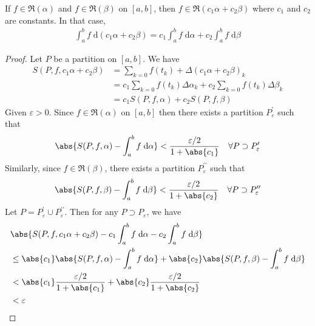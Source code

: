 \documentclass[thmcnt=section, 12pt]{elegantbook}
\begin{document}
\begin{theorem} \label{thm:35}
    If $f \in \mathfrak{R}(\alpha)$ and $f \in \mathfrak{R}(\beta)$ on $[a,b]$, then $f \in \mathfrak{R}(c_1 \alpha + c_2 \beta)$ where $c_1$ and $c_2$ are constants. In that case, 
    \begin{align*}
        \int_a^b f \; \mathrm{d}(c_1 \alpha + c_2 \beta)
        = c_1 \int_a^b f \; \mathrm{d}\alpha
        + c_2 \int_a^b f \; \mathrm{d}\beta
    \end{align*}
\end{theorem}

\begin{proof}
    Let $P$ be a partition on $[a,b]$. We have 
    \begin{align*}
        S(P, f, c_1 \alpha + c_2 \beta)
        &= \sum_{k=0} f(t_k) + \Delta(c_1 \alpha + c_2 \beta)_k \\ 
        &= c_1 \sum_{k=0} f(t_k) \Delta\alpha_k
        + c_2 \sum_{k=0} f(t_k) \Delta\beta_k \\ 
        &= c_1 S(P, f, \alpha) + c_2 S(P, f, \beta)
    \end{align*}
    Given $\varepsilon > 0$. Since $f \in \mathfrak{R}(\alpha)$ on $[a,b]$ then there exists a partition $P_\varepsilon^{\prime}$
    such that 
    \begin{align*}
        \abs{S(P, f, \alpha) - \int_a^b f \; \mathrm{d}\alpha} < \frac{\varepsilon / 2}{1 + \abs{c_1}}
        \quad \forall P \supset P_\varepsilon^{\prime}
    \end{align*}
    Similarly, since $f \in \mathfrak{R}(\beta)$, there exists a partition $P_\varepsilon^{\prime\prime}$ such that 
    \begin{align*}
        \abs{S(P, f, \beta) - \int_a^b f \; \mathrm{d}\beta} < \frac{\varepsilon / 2}{1 + \abs{c_2}}
        \quad \forall P \supset P_\varepsilon^{\prime\prime}
    \end{align*}
    Let $P = P_\varepsilon^{\prime} \cup P_\varepsilon^{\prime\prime}$. Then for any $P \supset P_\varepsilon$, we have 
    \begin{align*}
        &\abs{
            S(P, f, c_1 \alpha + c_2 \beta) 
            - c_1 \int_a^b f \; \mathrm{d}\alpha
            - c_2 \int_a^b f \; \mathrm{d}\beta
        } \\
        &\leq \abs{c_1} \abs{S(P,f,\alpha) - \int_a^b f \; \mathrm{d}\alpha}
        + \abs{c_2} \abs{S(P,f,\beta) - \int_a^b f \; \mathrm{d}\beta} \\ 
        &< \abs{c_1} \frac{\varepsilon / 2}{1 + \abs{c_1}}
        + \abs{c_2} \frac{\varepsilon / 2}{1 + \abs{c_2}} \\ 
        &< \varepsilon
    \end{align*}
\end{proof}
\end{document}
